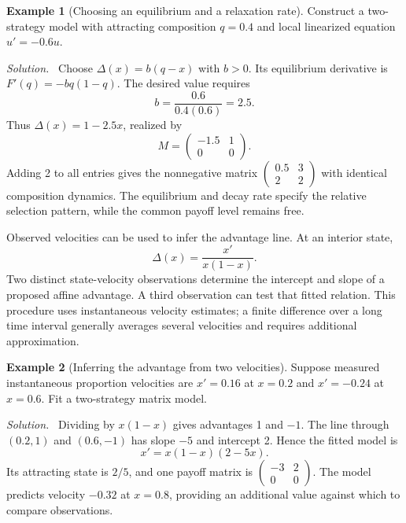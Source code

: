 \documentclass[11pt,oneside,openany]{book}
\theoremstyle{definition}
\newtheorem{example}{Example}[chapter]
\theoremstyle{remark}
\newenvironment{solution}{\par\smallskip\noindent\textit{Solution.}\ }{\par\smallskip}
\numberwithin{equation}{chapter}
\begin{document}
\begin{example}[Choosing an equilibrium and a relaxation rate]
Construct a two-strategy model with attracting composition $q=0.4$ and local linearized equation $u'=-0.6u$.
\begin{solution}
Choose $\Delta(x)=b(q-x)$ with $b>0$. Its equilibrium derivative is $F'(q)=-bq(1-q)$. The desired value requires
\[
b=\frac{0.6}{0.4(0.6)}=2.5.
\]
Thus $\Delta(x)=1-2.5x$, realized by
\[
M=\begin{pmatrix}-1.5&1\\0&0\end{pmatrix}.
\]
Adding 2 to all entries gives the nonnegative matrix $\left(\begin{smallmatrix}0.5&3\\2&2\end{smallmatrix}\right)$ with identical composition dynamics. The equilibrium and decay rate specify the relative selection pattern, while the common payoff level remains free.
\end{solution}
\end{example}

Observed velocities can be used to infer the advantage line. At an interior state,
\[
\Delta(x)=\frac{x'}{x(1-x)}.
\]
Two distinct state-velocity observations determine the intercept and slope of a proposed affine advantage. A third observation can test that fitted relation. This procedure uses instantaneous velocity estimates; a finite difference over a long time interval generally averages several velocities and requires additional approximation.

\begin{example}[Inferring the advantage from two velocities]
Suppose measured instantaneous proportion velocities are $x'=0.16$ at $x=0.2$ and $x'=-0.24$ at $x=0.6$. Fit a two-strategy matrix model.
\begin{solution}
Dividing by $x(1-x)$ gives advantages 1 and $-1$. The line through $(0.2,1)$ and $(0.6,-1)$ has slope $-5$ and intercept 2. Hence the fitted model is
\[
x'=x(1-x)(2-5x).
\]
Its attracting state is $2/5$, and one payoff matrix is $\left(\begin{smallmatrix}-3&2\\0&0\end{smallmatrix}\right)$. The model predicts velocity $-0.32$ at $x=0.8$, providing an additional value against which to compare observations.
\end{solution}
\end{example}
\end{document}
